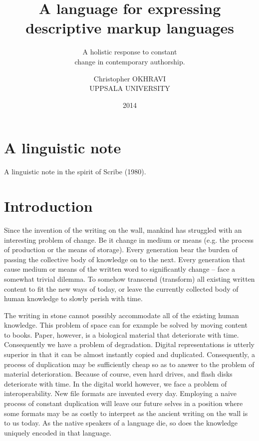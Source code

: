\documentclass{scrreprt}
\date{2014}
\title{ A language for expressing \\ descriptive markup languages }
\subtitle{A holistic response to constant \\ change in contemporary authorship.}
\author{ Christopher OKHRAVI \\ UPPSALA UNIVERSITY }
\begin{document}
\maketitle
{} %
\tableofcontents
\pagebreak





%
%
%
%
%
%
\chapter*{A linguistic note}
A linguistic note in the spirit of Scribe (1980).
 






%
%
%
%
%
%
\glsaddall
\printglossary






%
%
%
%
%
%

\chapter{Introduction}

Since the invention of the writing on the wall, mankind has struggled with an interesting problem of change. Be it change in medium or means (e.g. the process of production or the means of storage). Every generation bear the burden of passing the collective body of knowledge on to the next. Every generation that cause medium or means of the written word to significantly change --  face a somewhat trivial dilemma. To somehow transcend (transform) all existing written content to fit the new ways of today, or leave the currently collected body of human knowledge to slowly perish with time.

The writing in stone cannot possibly accommodate all of the existing human knowledge. This problem of space can for example be solved by moving content to books. Paper, however, is a biological material that deteriorate with time. Consequently we have a problem of degradation. Digital representations is utterly superior in that it can be almost instantly copied and duplicated. Consequently, a process of duplication may be sufficiently cheap so as to answer to the problem of material deterioration. Because of course, even hard drives, and flash disks deteriorate with time. In the digital world however, we face a problem of interoperability. New file formats are invented every day. Employing a naive process of constant duplication will leave our future selves in a position where some formats may be as costly to interpret as the ancient writing on the wall is to us today. As the native speakers of a language die, so does the knowledge uniquely encoded in that language.
\end{document}
